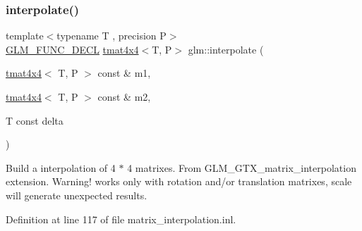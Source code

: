 \mbox{\label{group__gtx__matrix__interpolation_ga45099a92c5c704503565619ac2bcd5c6}} 
\subsubsection{\texorpdfstring{interpolate()}{interpolate()}}
{\footnotesize\ttfamily template$<$typename T , precision P$>$ \\
\mbox{\hyperlink{setup_8hpp_ab2d052de21a70539923e9bcbf6e83a51}{G\+L\+M\+\_\+\+F\+U\+N\+C\+\_\+\+D\+E\+CL}} \mbox{\hyperlink{structglm_1_1tmat4x4}{tmat4x4}}$<$T, P$>$ glm\+::interpolate (\begin{DoxyParamCaption}\item[{\mbox{\hyperlink{structglm_1_1tmat4x4}{tmat4x4}}$<$ T, P $>$ const \&}]{m1,  }\item[{\mbox{\hyperlink{structglm_1_1tmat4x4}{tmat4x4}}$<$ T, P $>$ const \&}]{m2,  }\item[{T const}]{delta }\end{DoxyParamCaption})}

Build a interpolation of 4 $\ast$ 4 matrixes. From G\+L\+M\+\_\+\+G\+T\+X\+\_\+matrix\+\_\+interpolation extension. Warning! works only with rotation and/or translation matrixes, scale will generate unexpected results. 

Definition at line 117 of file matrix\+\_\+interpolation.\+inl.

